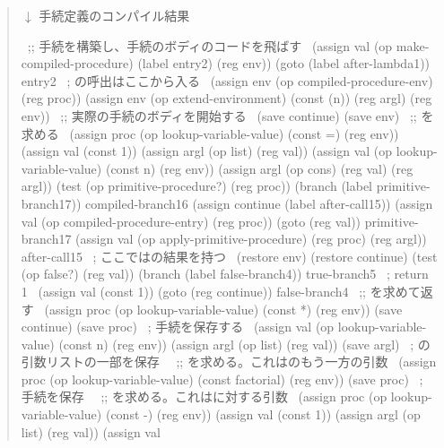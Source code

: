 \begin{quote}
 \( \downarrow \) 手続定義のコンパイル結果

\begin{smallscheme}
~\textrm{;; 手続を構築し、手続のボディのコードを飛ばす}~
  (assign val
          (op make-compiled-procedure) 
          (label entry2) 
          (reg env))
  (goto (label after-lambda1))
entry2     ~\textrm{; の呼出はここから入る}~
  (assign env (op compiled-procedure-env) (reg proc))
  (assign env
          (op extend-environment) 
          (const (n)) 
          (reg argl) 
          (reg env))
~\textrm{;; 実際の手続のボディを開始する}~
  (save continue)
  (save env)
~\textrm{;; を求める}~
  (assign proc 
          (op lookup-variable-value) 
          (const =) 
          (reg env))
  (assign val (const 1))
  (assign argl (op list) (reg val))
  (assign val 
          (op lookup-variable-value) 
          (const n) 
          (reg env))
  (assign argl (op cons) (reg val) (reg argl))
  (test (op primitive-procedure?) (reg proc))
  (branch (label primitive-branch17))
compiled-branch16
  (assign continue (label after-call15))
  (assign val (op compiled-procedure-entry) (reg proc))
  (goto (reg val))
primitive-branch17
  (assign val 
          (op apply-primitive-procedure) 
          (reg proc) 
          (reg argl))
after-call15   ~\textrm{; ここではの結果を持つ}~
  (restore env)
  (restore continue)
  (test (op false?) (reg val))
  (branch (label false-branch4))
true-branch5  ~\textrm{; return 1}~
  (assign val (const 1))
  (goto (reg continue))
false-branch4
~\textrm{;; を求めて返す}~
  (assign proc 
          (op lookup-variable-value) 
          (const *) 
          (reg env))
  (save continue)
  (save proc)   ~\textrm{; \code{*}手続を保存する}~
  (assign val 
          (op lookup-variable-value) 
          (const n) 
          (reg env))
  (assign argl (op list) (reg val))
  (save argl)   ~\textrm{; \code{*}の引数リストの一部を保存}~
~\textrm{;; を求める。これは\code{*}のもう一方の引数}~
  (assign proc
          (op lookup-variable-value) 
          (const factorial) 
          (reg env))
  (save proc)  ~\textrm{; 手続を保存}~
~\textrm{;; を求める。これはに対する引数}~
  (assign proc 
          (op lookup-variable-value)
          (const -) 
          (reg env))
  (assign val (const 1))
  (assign argl (op list) (reg val))
  (assign val 

\end{smallscheme}
\end{quote}
